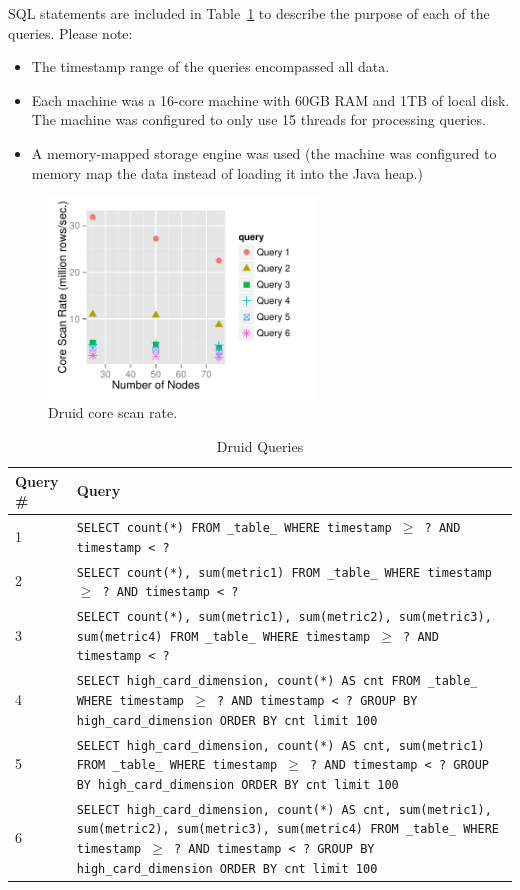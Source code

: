 \documentclass{vldb}
\begin{document}
SQL statements are included in Table~\ref{tab:sql_queries} to describe the
purpose of each of the queries. Please note:
\begin{itemize}
\item The timestamp range of the queries encompassed all data.
\item Each machine was a 16-core machine with 60GB RAM and 1TB of local
  disk. The machine was configured to only use 15 threads for
  processing queries.
\item A memory-mapped storage engine was used (the machine was configured to memory map the data
  instead of loading it into the Java heap.)
\end{itemize}

\begin{figure}
\centering
\includegraphics[width = 2.8in]{core_scan_rate}
\caption{Druid core scan rate.}
\label{fig:core_scan_rate}
\end{figure}

\begin{table}
  \centering
  \caption{Druid Queries}
  \label{tab:sql_queries}
  \begin{tabular}{| l | p{15cm} |}
    \hline
    \textbf{Query \#} & \textbf{Query} \\ \hline
    1 & \texttt{SELECT count(*) FROM \_table\_ WHERE timestamp $\geq$ ? AND timestamp < ?} \\ \hline
    2 & \texttt{SELECT count(*), sum(metric1) FROM \_table\_ WHERE timestamp $\geq$ ? AND timestamp < ?} \\ \hline
    3 & \texttt{SELECT count(*), sum(metric1), sum(metric2), sum(metric3), sum(metric4) FROM \_table\_ WHERE timestamp $\geq$ ? AND timestamp < ?} \\ \hline
    4 & \texttt{SELECT high\_card\_dimension, count(*) AS cnt FROM \_table\_ WHERE timestamp $\geq$ ? AND timestamp < ? GROUP BY high\_card\_dimension ORDER BY cnt limit 100} \\ \hline
    5 & \texttt{SELECT high\_card\_dimension, count(*) AS cnt, sum(metric1) FROM \_table\_ WHERE timestamp $\geq$ ? AND timestamp < ? GROUP BY high\_card\_dimension ORDER BY cnt limit 100} \\ \hline
    6 & \texttt{SELECT high\_card\_dimension, count(*) AS cnt, sum(metric1), sum(metric2), sum(metric3), sum(metric4) FROM \_table\_ WHERE timestamp $\geq$ ? AND timestamp < ? GROUP BY high\_card\_dimension ORDER BY cnt limit 100} \\ \hline
  \end{tabular}
\end{table}
\end{document}
